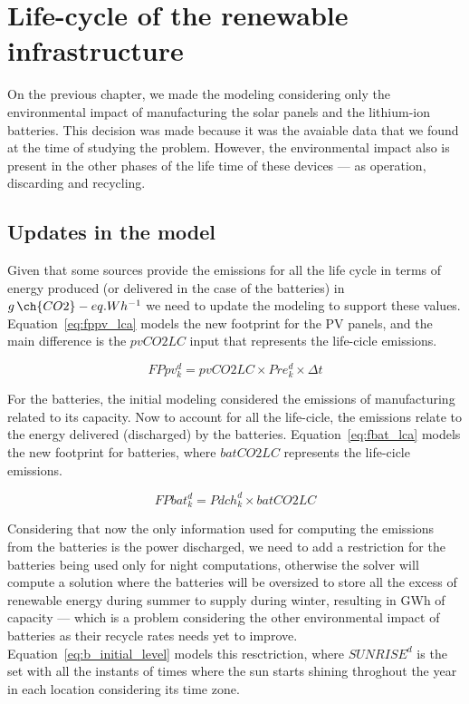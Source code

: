 \section{Life-cycle of the renewable infrastructure}

On the previous chapter, we made the modeling considering only the environmental impact of manufacturing the solar panels and the lithium-ion batteries. This decision was made because it was the avaiable data that we found at the time of studying the problem. However, the environmental impact also is present in the other phases of the life time of these devices --- as operation, discarding and recycling.

\subsection{Updates in the model}

Given that some sources provide the emissions for all the life cycle in terms of energy produced (or delivered in the case of the batteries) in $g\,\ch{CO2}-eq.Wh^{-1}$ we need to update the modeling to support these values. Equation~\eqref{eq:fppv_lca} models the new footprint for the PV panels, and the main difference is the $pvCO2LC$ input that represents the life-cicle emissions.

\begin{equation} \label{eq:fppv_lca}
   FPpv^d_k =  pvCO2LC \times Pre_k^d \times \Delta t
\end{equation}


For the batteries, the initial modeling considered the emissions of manufacturing related to its capacity. Now to account for all the life-cicle, the emissions relate to the energy delivered (discharged) by the batteries. Equation~\eqref{eq:fbat_lca} models the new footprint for batteries, where $batCO2LC$ represents the life-cicle emissions. 

\begin{equation} \label{eq:fbat_lca}
   FPbat^d_k =  Pdch^d_k \times batCO2LC
 \end{equation}
 
Considering that now the only information used for computing the emissions from the batteries is the power discharged, we need to add a restriction for the batteries being used only for night computations, otherwise the solver will compute a solution where the batteries will be oversized to store all the excess of renewable energy during summer to supply during winter, resulting in GWh of capacity --- which is a problem considering the other environmental impact of batteries as their recycle rates needs yet to improve. Equation~\eqref{eq:b_initial_level}  models this resctriction, where $SUNRISE^d$ is the set with all the instants of times where the sun starts shining throghout the year in each location considering its time zone.

